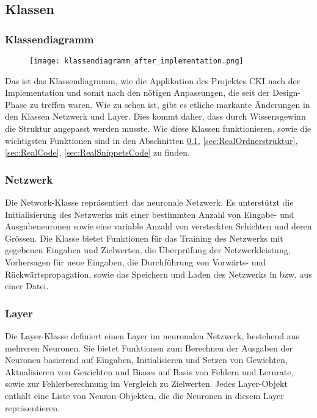\subsection{Klassen}
\label{sec:RealKlassen}
\subsubsection{Klassendiagramm}
\label{sec:RealKlassendiagramm}
\begin{figure}[H]
	\centering
		\texttt{[image: klassendiagramm\_after\_implementation.png]}
	\label{fig:klassendiagramm after implementation}
\end{figure}
Das ist das Klassendiagramm, wie die Applikation des Projektes CKI nach der Implementation und somit nach den nötigen Anpassungen, die seit der Design-Phase zu treffen waren. Wie zu sehen ist, gibt es etliche markante Änderungen in den Klassen Netzwerk und Layer. Dies kommt daher, dass durch Wissensgewinn die Struktur angepasst werden musste. Wie diese Klassen funktionieren, sowie die wichtigsten Funktionen sind in den Abschnitten \ref{sec:RealKlassen}, \ref{sec:RealOrdnerstruktur}, \ref{sec:RealCode}, \ref{sec:RealSnippetsCode} zu finden.

\subsubsection{Netzwerk}
\label{sec:RealNetzwerk}
Die Network-Klasse repräsentiert das neuronale Netzwerk. Es unterstützt die Initialisierung des Netzwerks mit einer bestimmten Anzahl von Eingabe- und Ausgabeneuronen sowie eine variable Anzahl von versteckten Schichten und deren Grössen. Die Klasse bietet Funktionen für das Training des Netzwerks mit gegebenen Eingaben und Zielwerten, die Überprüfung der Netzwerkleistung, Vorhersagen für neue Eingaben, die Durchführung von Vorwärts- und Rückwärtspropagation, sowie das Speichern und Laden des Netzwerks in bzw. aus einer Datei. 
\subsubsection{Layer}
\label{sec:RealLayer}
Die Layer-Klasse definiert einen Layer im neuronalen Netzwerk, bestehend aus mehreren Neuronen. Sie bietet Funktionen zum Berechnen der Ausgaben der Neuronen basierend auf Eingaben, Initialisieren und Setzen von Gewichten, Aktualisieren von Gewichten und Biases auf Basis von Fehlern und Lernrate, sowie zur Fehlerberechnung im Vergleich zu Zielwerten. Jedes Layer-Objekt enthält eine Liste von Neuron-Objekten, die die Neuronen in diesem Layer repräsentieren. 
